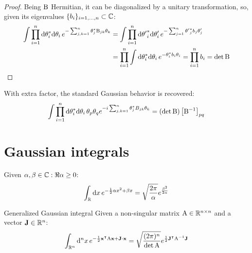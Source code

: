 \begin{proofbox}
  \begin{proof}
    Being $ \mathrm{B} $ Hermitian, it can be diagonalized by a unitary transformation, so, given its eigenvalues $ \{b_i\}_{i = 1,\dots,n} \subset \mathbb{C} $:
    \begin{equation*}
      \begin{split}
        \int \prod_{i = 1}^n \mathrm{d} \theta_i^* \mathrm{d} \theta_i\, e^{- \sum_{j,k = 1}^n \theta_j^* \mathrm{B}_{jk} \theta_k}
        & = \int \prod_{i = 1}^n \mathrm{d} {\theta'}^*_i \mathrm{d} \theta'_i\, e^{- \sum_{j = 1}^n {\theta'}^*_j b_j \theta'_j} \\
        & = \prod_{i = 1}^n \int \mathrm{d} \theta_i^* \mathrm{d} \theta_i\, e^{- \theta_i^* b_i \theta_i} = \prod_{i = 1}^n b_i = \det \mathrm{B}
      \end{split}
    \end{equation*}
  \end{proof}
\end{proofbox}

With extra factor, the standard Gaussian behavior is recovered:
\begin{equation}
  \int \prod_{i = 1}^n \mathrm{d} \theta_i^* \mathrm{d} \theta_i\, \theta_p \theta_q e^{-i \sum_{j,k = 1}^n \theta_j^* B_{jk} \theta_k} = \left( \det \mathrm{B} \right) \left[ \mathrm{B}^{-1} \right]_{pq}
  \label{eq:grass-gauss-2}
\end{equation}

\section{Gaussian integrals}

\begin{lemma}{}{}
  Given $ \alpha , \beta \in \mathbb{C} : \Re{\alpha} \ge 0 $:
  \begin{equation}
    \int_{\mathbb{R}} \mathrm{d} x\, e^{-\frac{1}{2} \alpha x^2 + \beta x} = \sqrt{\frac{2\pi}{\alpha}} e^{\frac{\beta^2}{2\alpha}}
    \label{eq:gauss-int}
  \end{equation}
\end{lemma}

\begin{proposition}{Generalized Gaussian integral}{}
  Given a non-singular matrix $ \mathrm{A} \in \mathbb{R}^{n \times n} $ and a vector $ \mathbf{J} \in \mathbb{R}^n $:
  \begin{equation}
    \int_{\mathbb{R}^n} \mathrm{d}^nx\, e^{-\frac{1}{2} \mathbf{x}^\intercal \mathrm{A} \mathbf{x} + \mathbf{J} \cdot \mathbf{x}} = \sqrt{\frac{(2\pi)^n}{\det\mathrm{A}}} e^{\frac{1}{2} \mathbf{J}^\intercal \mathrm{A}^{-1} \mathbf{J}}
  \end{equation}
\end{proposition}

